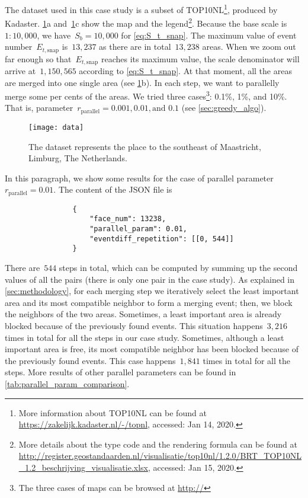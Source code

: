 \documentclass[ijgi,article,submit,moreauthors,pdftex]{Definitions/mdpi}
\begin{document}
The dataset used in this case study is a subset of TOP10NL\footnote{%
More information about TOP10NL can be found at
\url{https://zakelijk.kadaster.nl/-/topnl},
accessed: Jan 14, 2020.},
produced by Kadaster.
%
\figs\ref{fig:data}a and~\ref{fig:data}c show the map and the legend\footnote{%
More details about the type code and the rendering formula can be found at
\url{http://register.geostandaarden.nl/visualisatie/top10nl/1.2.0/BRT_TOP10NL_1.2_beschrijving_visualisatie.xlsx},
accessed: Jan 15, 2020.}.
%
Because the base scale is $1:10{,}000$, 
we have~$S_b = 10{,}000$ for \eq\ref{eq:S_t_snap}.
The maximum value of event number~$E_{t,\mathrm{snap}}$ is~$13{,}237$
as there are in total~$13{,}238$ areas.
When we zoom out far enough 
so that~$E_{t,\mathrm{snap}}$ reaches its maximum value,
the scale denominator will arrive at~$1{,}150{,}565$
according to \eq\ref{eq:S_t_snap}.
At that moment, all the areas are merged into one single area
(see \figs\ref{fig:data}b).
In each step, we want to parallelly merge some per cents of the areas.
We tried three cases\footnote{%
The three cases of maps can be browsed at
\url{http://}}: 
0.1\%, 1\%, and 10\%.
That is, parameter~$r_\mathrm{parallel}=0.001, 0.01, \text{and~} 0.1$ 
(see \sect\ref{sec:greedy_algo}).

\begin{figure}[tb]
\centering
\texttt{[image: data]}
\caption{The dataset represents the place 
    to the southeast of Maastricht, Limburg, The Netherlands.}
\label{fig:data}
\end{figure}

In this paragraph, we show some results for the case of 
parallel parameter~$r_\mathrm{parallel}= 0.01$.
The content of the JSON file is 
\begin{verbatim}
                {
                    "face_num": 13238,
                    "parallel_param": 0.01,                    
                    "eventdiff_repetition": [[0, 544]]
                }
\end{verbatim}
There are~$544$ steps in total, 
which can be computed by summing up the second values of all the pairs
(there is only one pair in the case study).
%
As explained in \sect\ref{sec:methodology}, 
for each merging step we iteratively select the least important area 
and its most compatible neighbor to form a merging event; 
then, we block the neighbors of the two areas.
Sometimes, a least important area is already blocked 
because of the previously found events.
This situation happens~$3{,}216$ times in total for all the steps
in our case study.
%
Sometimes, although a least important area is free, 
its most compatible neighbor has been blocked 
because of the previously found events.
This case happens~$1{,}841$ times in total for all the steps.
%
More results of other parallel parameters 
can be found in \tbl\ref{tab:parallel_param_comparison}.
\end{document}
